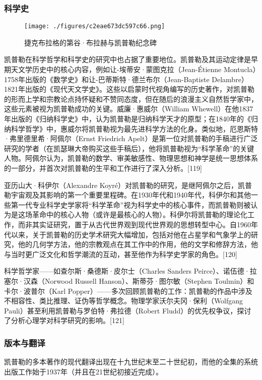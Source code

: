 \subsubsection{科学史}
\begin{figure}[ht]
\centering
\texttt{[image: ./figures/c2eae673dc597c66.png]}
\caption{捷克布拉格的第谷·布拉赫与凯普勒纪念碑} \label{fig_KPL1_18}
\end{figure}
凯普勒在科学哲学和科学史的研究中也占据了重要地位。凯普勒及其运动定律是早期天文学历史中的核心内容，例如让-埃蒂安·蒙图克拉（Jean-Étienne Montucla）1758年出版的《数学史》和让-巴蒂斯特·德兰布尔（Jean-Baptiste Delambre）1821年出版的《现代天文学史》。这些以启蒙时代视角编写的历史著作，对凯普勒的形而上学和宗教论点持怀疑和不赞同态度，但在随后的浪漫主义自然哲学家中，这些元素被视为凯普勒成功的关键。威廉·惠威尔（William Whewell）在他1837年出版的《归纳科学史》中，认为凯普勒是归纳科学天才的原型；在1840年的《归纳科学哲学》中，惠威尔将凯普勒视为最先进科学方法的化身。类似地，厄恩斯特·弗里德里希·阿佩尔（Ernst Friedrich Apelt）是第一位对凯普勒的手稿进行广泛研究的学者（在凯瑟琳大帝购买这些手稿后），他将凯普勒视为“科学革命”的关键人物。阿佩尔认为，凯普勒的数学、审美敏感性、物理思想和神学是统一思想体系的一部分，并首次对凯普勒的生平和工作进行了深入分析。[119]

亚历山大·科伊尔（Alexandre Koyré）对凯普勒的研究，是继阿佩尔之后，凯普勒宇宙观及其影响的第一个重要里程碑。在1930年代和1940年代，科伊尔和其他一些第一代专业科学史学家将“科学革命”视为科学史中的核心事件，而凯普勒则被认为是这场革命中的核心人物（或许是最核心的人物）。科伊尔将凯普勒的理论化工作，而非其实证研究，置于从古代世界观到现代世界观的思想转型中心。自1960年代以来，关于凯普勒的历史学术研究大幅增加，包括对他在占星学和气象学上的研究，他的几何学方法，他的宗教观点在其工作中的作用，他的文学和修辞方法，他与当时更广泛文化和哲学潮流的互动，甚至他作为科学史学家的角色。[120]

科学哲学家——如查尔斯·桑德斯·皮尔士（Charles Sanders Peirce）、诺伍德·拉塞尔·汉森（Norwood Russell Hanson）、斯蒂芬·图尔敏（Stephen Toulmin）和卡尔·波普尔（Karl Popper）——多次回顾凯普勒的工作：凯普勒的作品中涉及不相容性、类比推理、证伪等哲学概念。物理学家沃尔夫冈·保利（Wolfgang Pauli）甚至利用凯普勒与罗伯特·弗拉德（Robert Fludd）的优先权争议，探讨了分析心理学对科学研究的影响。[121]
\subsubsection{版本与翻译}
凯普勒的多本著作的现代翻译出现在十九世纪末至二十世纪初，而他的全集的系统出版工作始于1937年（并且在21世纪初接近完成）。

